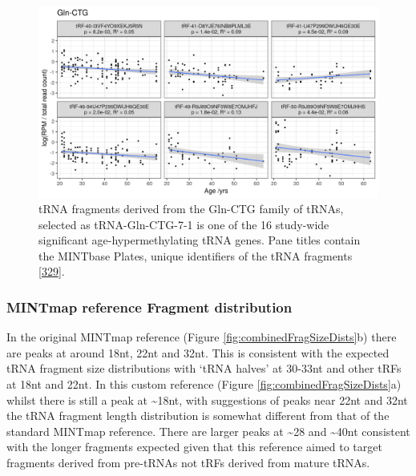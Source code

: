 \documentclass[
]{book}
\begin{document}
\begin{figure}

{\centering \includegraphics[width=1\linewidth]{./figs/nonSigIsoMapbbswsPlotsGln-CTG} 

}

\caption{tRNA fragments derived from the Gln-CTG family of tRNAs, selected as tRNA-Gln-CTG-7-1 is one of the 16 study-wide significant age-hypermethylating tRNA genes. Pane titles contain the MINTbase Plates, unique identifiers of the tRNA fragments {[}\protect\hyperlink{ref-Pliatsika2018}{329}{]}.}\label{fig:mintmapres}
\end{figure}



\hypertarget{mintmap-reference-fragment-distribution}{%
\subsubsection{MINTmap reference Fragment distribution}\label{mintmap-reference-fragment-distribution}}

In the original MINTmap reference (Figure \ref{fig:combinedFragSizeDists}b) there are peaks at around 18nt, 22nt and 32nt.
This is consistent with the expected tRNA fragment size distributions with `tRNA halves' at 30-33nt and other tRFs at 18nt and 22nt.
In this custom reference (Figure \ref{fig:combinedFragSizeDists}a) whilst there is still a peak at \textasciitilde18nt, with suggestions of peaks near 22nt and 32nt the tRNA fragment length distribution is somewhat different from that of the standard MINTmap reference.
There are larger peaks at \textasciitilde28 and \textasciitilde40nt consistent with the longer fragments expected given that this reference aimed to target fragments derived from pre-tRNAs not tRFs derived from mature tRNAs.
\end{document}
